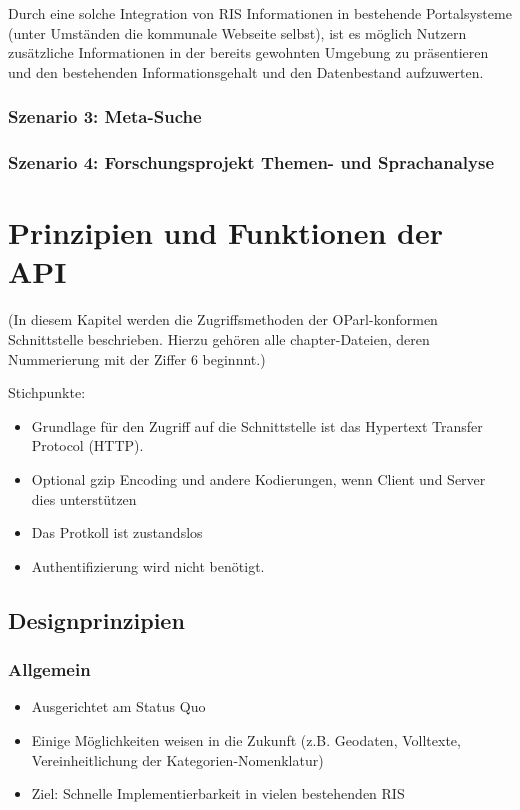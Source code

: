 \documentclass[,a4paper]{article}
\begin{document}
Durch eine solche Integration von RIS Informationen in bestehende
Portalsysteme (unter Umständen die kommunale Webseite selbst), ist es
möglich Nutzern zusätzliche Informationen in der bereits gewohnten
Umgebung zu präsentieren und den bestehenden Informationsgehalt und den
Datenbestand aufzuwerten.

\subsubsection{Szenario 3: Meta-Suche}

\subsubsection{Szenario 4: Forschungsprojekt Themen- und Sprachanalyse}

\section{Prinzipien und Funktionen der API}

(In diesem Kapitel werden die Zugriffsmethoden der OParl-konformen
Schnittstelle beschrieben. Hierzu gehören alle chapter-Dateien, deren
Nummerierung mit der Ziffer 6 beginnnt.)

Stichpunkte:

\begin{itemize}
\item
  Grundlage für den Zugriff auf die Schnittstelle ist das Hypertext
  Transfer Protocol (HTTP).
\item
  Optional gzip Encoding und andere Kodierungen, wenn Client und Server
  dies unterstützen
\item
  Das Protkoll ist zustandslos
\item
  Authentifizierung wird nicht benötigt.
\end{itemize}

\subsection{Designprinzipien}

\subsubsection{Allgemein}

\begin{itemize}
\item
  Ausgerichtet am Status Quo
\item
  Einige Möglichkeiten weisen in die Zukunft (z.B. Geodaten, Volltexte,
  Vereinheitlichung der Kategorien-Nomenklatur)
\item
  Ziel: Schnelle Implementierbarkeit in vielen bestehenden RIS
\end{itemize}
\end{document}
